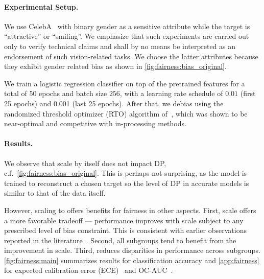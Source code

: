 \paragraph{Experimental Setup.} We use CelebA~\citep{liu2015faceattributes} with binary gender as a sensitive attribute while the target is  ``attractive'' or ``smiling''. We emphasize that such experiments are carried out only to verify technical claims and shall by no means be interpreted as an endorsement of such vision-related tasks. We choose the latter attributes because they exhibit gender related bias as shown in \cref{fig:fairness:bias_original}.

We train a logistic regression classifier on top of the \chonk pretrained features for a total of $50$ epochs and batch size $256$, with a learning rate schedule of $0.01$ (first 25 epochs) and 0.001 (last 25 epochs).  After that, we debias using the randomized threshold optimizer (RTO) algorithm of~\citet{alabdulmohsin2021}, which was shown to be near-optimal and competitive with in-processing methods. %

\paragraph{Results.}
We observe that scale by itself does not impact DP, c.f.\ \cref{fig:fairness:bias_original}. This is perhaps not surprising, as the model is trained to reconstruct a chosen target so the level of DP in accurate models is similar to that of the data itself.

However, scaling to \chonk offers benefits for fairness in other aspects. First, scale offers a more favorable tradeoff ---  performance improves with scale subject to any prescribed level of bias constraint.
This is consistent with earlier observations reported in the literature~\citep{alabdulmohsin2021}.  Second, all subgroups tend to benefit from the improvement in scale. Third, \chonk reduces disparities in performance across subgroups. 
\cref{fig:fairness:main} summarizes results for classification accuracy and \cref{app:fairness} for expected calibration error (ECE)~\citep{naeini2015obtaining,guo2017calibration} and OC-AUC~\citep{kivlichan2021measuring}.


